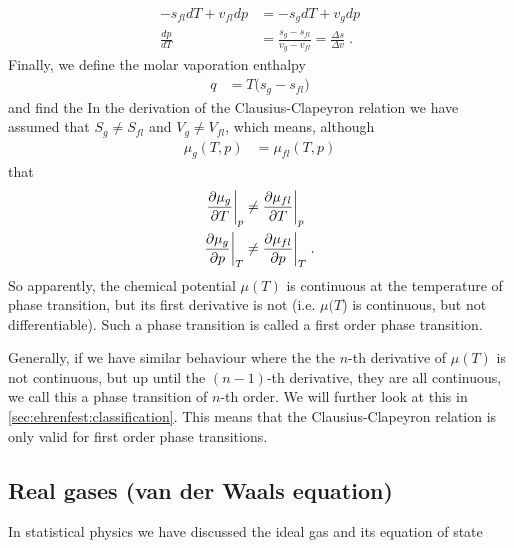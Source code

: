 \begin{align*}
- s_{fl}  dT + v_{fl} dp &= - s_{g}  dT + v_{g} dp \\
\frac{dp}{dT} &= \frac{s_{g}-s_{fl}}{v_{g}-v_{fl}} = \frac{\Delta s}{\Delta v}\;.
\end{align*}
Finally, we define the molar vaporation enthalpy
%
\begin{align*}
q &= T\big( s_{g}-s_{fl} \big)
\end{align*}
%
and find the
In the derivation of the Clausius-Clapeyron relation we have assumed that $ S_{g}\ne S_{fl}$
and $V_{g}\ne V_{fl}$, which means, although 
%
\begin{align*}
\mu_{g}(T,p) &=\mu_{fl}(T,p) 
\end{align*}
%
that
%
\begin{align*}
\frac{\partial \mu_{g}}{\partial T}\bigg|_{p} &\ne \frac{\partial \mu_{fl}}{\partial T}\bigg|_{p}\\
\frac{\partial \mu_{g}}{\partial p}\bigg|_{T} &\ne \frac{\partial \mu_{fl}}{\partial p}\bigg|_{T}\;.
\end{align*}
%
So apparently, the chemical potential $\mu(T)$ is continuous at the temperature of phase transition, but its first derivative is not (i.e. $\mu(T$) is continuous, but not differentiable). Such a phase transition is called a first order phase transition.

Generally, if we have similar behaviour where the the $n$-th derivative of $\mu(T)$ is not continuous, but up until the $(n-1)$-th derivative, they are all continuous, we call this a phase transition of $n$-th order. We will further look at this in \autoref{sec:ehrenfest:classification}. This means that the Clausius-Clapeyron relation is only valid for first order phase transitions.

\subsection{Real gases (van der Waals equation)}
In statistical physics we have discussed the ideal gas and its equation of state

